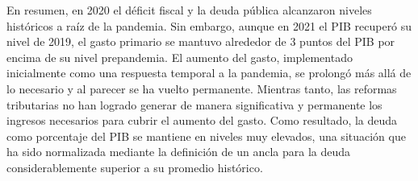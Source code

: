 En resumen, en 2020 el déficit fiscal y la deuda pública alcanzaron niveles históricos a raíz de la pandemia. Sin embargo, aunque en 2021 el PIB recuperó su nivel de 2019, el gasto primario se mantuvo alrededor de 3 puntos del PIB por encima de su nivel prepandemia. El aumento del gasto, implementado inicialmente como una respuesta temporal a la pandemia, se prolongó más allá de lo necesario y al parecer se ha vuelto permanente. Mientras tanto, las reformas tributarias no han logrado generar de manera significativa y permanente los ingresos necesarios para cubrir el aumento del gasto. Como resultado, la deuda como porcentaje del PIB se mantiene en niveles muy elevados, una situación que ha sido normalizada mediante la definición de un ancla para la deuda considerablemente superior a su promedio histórico.
